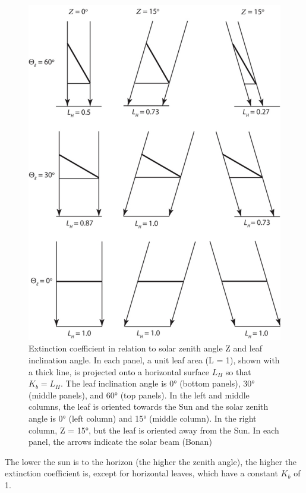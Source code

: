\documentclass[
  12pt,
  oneside]{book}
\begin{document}
\begin{figure}

{\centering \includegraphics[width=0.8\linewidth]{figures/chap3/f311_LLh} 

}

\caption{Extinction coefficient in relation to solar zenith angle Ζ and leaf inclination angle. In each panel, a unit leaf area (L = 1), shown with a thick line, is projected onto a horizontal surface $L_H$ so that $K_b = L_H$. The leaf inclination angle is 0° (bottom panels), 30° (middle panels), and 60° (top panels). In the left and middle columns, the leaf is oriented towards the Sun and the solar zenith angle is 0° (left column) and 15° (middle column). In the right column, Ζ = 15°, but the leaf is oriented away from the Sun. In each panel, the arrows indicate the solar beam (Bonan)}\label{fig:f311}
\end{figure}

The lower the sun is to the horizon (the higher the zenith angle), the higher the extinction coefficient is, except for horizontal leaves, which have a constant \(K_b\) of 1.
\end{document}
